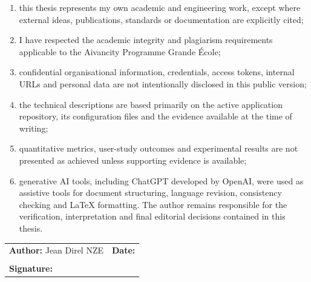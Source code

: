\begin{enumerate}
    \item this thesis represents my own academic and engineering work, except where external ideas, publications, standards or documentation are explicitly cited;
    \item I have respected the academic integrity and plagiarism requirements applicable to the Aivancity Programme Grande École;
    \item confidential organisational information, credentials, access tokens, internal URLs and personal data are not intentionally disclosed in this public version;
    \item the technical descriptions are based primarily on the active application repository, its configuration files and the evidence available at the time of writing;
    \item quantitative metrics, user-study outcomes and experimental results are not presented as achieved unless supporting evidence is available;
    \item generative AI tools, including ChatGPT developed by OpenAI, were used as assistive tools for document structuring, language revision, consistency checking and LaTeX formatting. The author remains responsible for the verification, interpretation and final editorial decisions contained in this thesis.
\end{enumerate}

\vspace{1.2cm}

\noindent\begin{tabular}{p{}p{}}
\textbf{Author:} Jean Direl NZE & \textbf{Date:} \dotfill \\
\vspace{1.2cm} & \\
\textbf{Signature:} \dotfill & \\
\end{tabular}
